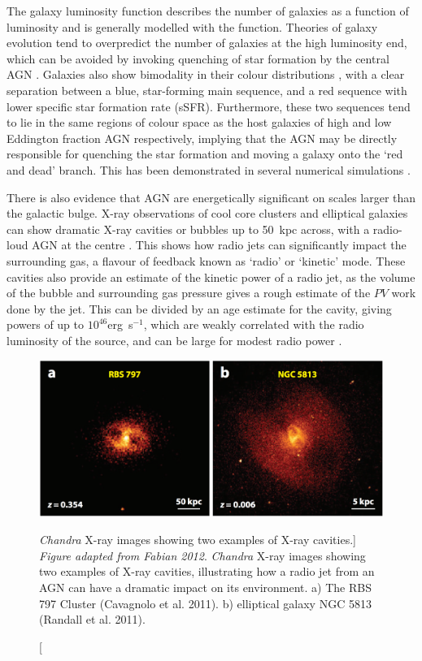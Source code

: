 The galaxy luminosity function describes
the number of galaxies as a function of luminosity and is generally modelled
with the \cite{schechter1976} function. Theories of 
galaxy evolution tend to overpredict the number of galaxies at the
high luminosity end, which can be avoided by invoking quenching
of star formation by the central AGN \citep[e.g.][]{read2005,bongiorno2016}.
Galaxies also show bimodality in their colour distributions 
\citep{strateva2001,bell2003a,baldry2004}, 
with a clear separation between a blue, star-forming
main sequence, and a red sequence with lower 
specific star formation rate (sSFR). Furthermore, these two 
sequences tend to lie in the same regions of colour space as the 
host galaxies of high and low 
Eddington fraction AGN respectively, implying that the AGN may be 
directly responsible for quenching the star formation and moving 
a galaxy onto the `red and dead' branch. This has been demonstrated in 
several numerical simulations \citep[e.g.][]{springel2005,croton2006}.

There is also evidence that AGN are energetically 
significant on scales larger than the galactic bulge. X-ray observations
of cool core clusters and elliptical galaxies
can show dramatic X-ray cavities or bubbles
up to 50~kpc across, with a radio-loud AGN at the centre
\citep[Fig.~\ref{fig:xray_bubbles}]{randall2011,cavagnolo2011,fabian2012}. This
shows how radio jets can significantly impact the surrounding gas,
a flavour of feedback known as `radio' or `kinetic' mode.
These cavities also provide an estimate of the kinetic power of a radio
jet, as the volume of the bubble and surrounding gas pressure gives a 
rough estimate of the $PV$ work done by the jet. This can be divided by
an age estimate for the cavity, giving powers
of up to $10^{46}$erg~s$^{-1}$, which are weakly 
correlated with the radio luminosity of the source, 
and can be large for modest radio power \citep{birzan2008}. 

\begin{figure}
\centering
\includegraphics[width=1.0\textwidth]{figures/02-outflows/xray_cavities.png}
\caption
[{\sl Chandra} X-ray images showing two examples of X-ray cavities.]
{
{\sl Figure adapted from Fabian 2012}. 
{\sl Chandra} X-ray images showing two examples of X-ray cavities,
illustrating how a radio jet from an AGN can have a dramatic impact 
on its environment. a) The RBS 797 Cluster (Cavagnolo et al. 2011). 
b) elliptical galaxy NGC 5813 (Randall et al. 2011).
} 
\label{fig:xray_bubbles}
\end{figure}

